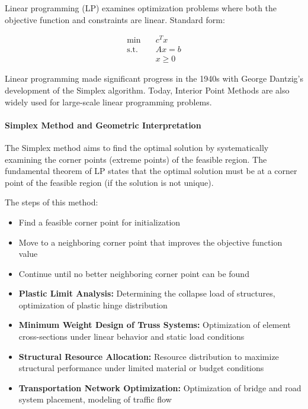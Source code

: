 Linear programming (LP) examines optimization problems where both the objective function and constraints are linear. Standard form:

\begin{equation}
\begin{aligned}
\min & \quad c^T x \\
\text{s.t.} & \quad Ax = b \\
& \quad x \geq 0
\end{aligned}
\end{equation}

Linear programming made significant progress in the 1940s with George Dantzig's development of the Simplex algorithm. Today, Interior Point Methods are also widely used for large-scale linear programming problems.

\paragraph{Simplex Method and Geometric Interpretation}
The Simplex method aims to find the optimal solution by systematically examining the corner points (extreme points) of the feasible region. The fundamental theorem of LP states that the optimal solution must be at a corner point of the feasible region (if the solution is not unique).

The steps of this method:
\begin{itemize}
    \item Find a feasible corner point for initialization
    \item Move to a neighboring corner point that improves the objective function value
    \item Continue until no better neighboring corner point can be found
\end{itemize}

\begin{tcolorbox}[title=LP Applications in Structural Engineering]
\begin{itemize}
    \item \textbf{Plastic Limit Analysis:} Determining the collapse load of structures, optimization of plastic hinge distribution
    
    \item \textbf{Minimum Weight Design of Truss Systems:} Optimization of element cross-sections under linear behavior and static load conditions
    
    \item \textbf{Structural Resource Allocation:} Resource distribution to maximize structural performance under limited material or budget conditions
    
    \item \textbf{Transportation Network Optimization:} Optimization of bridge and road system placement, modeling of traffic flow
\end{itemize}
\end{tcolorbox}

